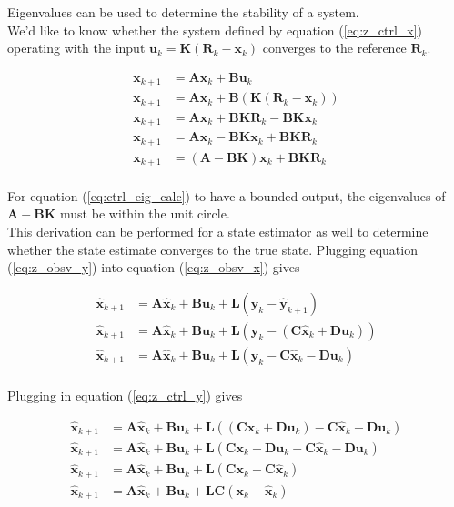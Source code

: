 \documentclass[10pt,conference,compsoc]{IEEEtran}
\newcommand{\mtx}[1] {\bm #1}
\begin{document}
Eigenvalues can be used to determine the stability of a \gls{system}. \\

We'd like to know whether the \gls{system} defined by equation
(\ref{eq:z_ctrl_x}) operating with the input
$\mtx{u}_k = \mtx{K}(\mtx{R}_k - \mtx{x}_k)$ converges to the \gls{reference}
$\mtx{R}_k$.

\begin{align}
  \mtx{x}_{k+1} &= \mtx{A}\mtx{x}_k + \mtx{B}\mtx{u}_k \nonumber \\
  \mtx{x}_{k+1} &= \mtx{A}\mtx{x}_k + \mtx{B}(\mtx{K}(\mtx{R}_k - \mtx{x}_k))
    \nonumber \\
  \mtx{x}_{k+1} &= \mtx{A}\mtx{x}_k + \mtx{B}\mtx{K}\mtx{R}_k -
    \mtx{B}\mtx{K}\mtx{x}_k \nonumber \\
  \mtx{x}_{k+1} &= \mtx{A}\mtx{x}_k - \mtx{B}\mtx{K}\mtx{x}_k +
    \mtx{B}\mtx{K}\mtx{R}_k \nonumber \\
  \mtx{x}_{k+1} &= (\mtx{A} - \mtx{B}\mtx{K})\mtx{x}_k +
    \mtx{B}\mtx{K}\mtx{R}_k \label{eq:ctrl_eig_calc}
\end{align}
\\
For equation (\ref{eq:ctrl_eig_calc}) to have a bounded output, the eigenvalues
of $\mtx{A} - \mtx{B}\mtx{K}$ must be within the unit circle. \\

This derivation can be performed for a \gls{state} estimator as well to
determine whether the \gls{state} estimate converges to the true \gls{state}.
Plugging equation (\ref{eq:z_obsv_y}) into equation (\ref{eq:z_obsv_x}) gives

\begin{align*}
  \hat{\mtx{x}}_{k+1} &= \mtx{A}\hat{\mtx{x}}_k + \mtx{B}\mtx{u}_k +
    \mtx{L} (\mtx{y}_k - \hat{\mtx{y}}_{k+1}) \\
  \hat{\mtx{x}}_{k+1} &= \mtx{A}\hat{\mtx{x}}_k + \mtx{B}\mtx{u}_k +
    \mtx{L} (\mtx{y}_k - (\mtx{C}\hat{\mtx{x}}_k + \mtx{D}\mtx{u}_k)) \\
  \hat{\mtx{x}}_{k+1} &= \mtx{A}\hat{\mtx{x}}_k + \mtx{B}\mtx{u}_k +
    \mtx{L} (\mtx{y}_k - \mtx{C}\hat{\mtx{x}}_k - \mtx{D}\mtx{u}_k) \\
\end{align*}

Plugging in equation (\ref{eq:z_ctrl_y}) gives

\begin{align*}
  \hat{\mtx{x}}_{k+1} &= \mtx{A}\hat{\mtx{x}}_k + \mtx{B}\mtx{u}_k +
    \mtx{L}((\mtx{C}\mtx{x}_k + \mtx{D}\mtx{u}_k) - \mtx{C}\hat{\mtx{x}}_k -
    \mtx{D}\mtx{u}_k) \\
  \hat{\mtx{x}}_{k+1} &= \mtx{A}\hat{\mtx{x}}_k + \mtx{B}\mtx{u}_k +
    \mtx{L}(\mtx{C}\mtx{x}_k + \mtx{D}\mtx{u}_k - \mtx{C}\hat{\mtx{x}}_k -
    \mtx{D}\mtx{u}_k) \\
  \hat{\mtx{x}}_{k+1} &= \mtx{A}\hat{\mtx{x}}_k + \mtx{B}\mtx{u}_k +
    \mtx{L}(\mtx{C}\mtx{x}_k - \mtx{C}\hat{\mtx{x}}_k) \\
  \hat{\mtx{x}}_{k+1} &= \mtx{A}\hat{\mtx{x}}_k + \mtx{B}\mtx{u}_k +
    \mtx{L}\mtx{C}(\mtx{x}_k - \hat{\mtx{x}}_k) \\
\end{align*}
\end{document}
